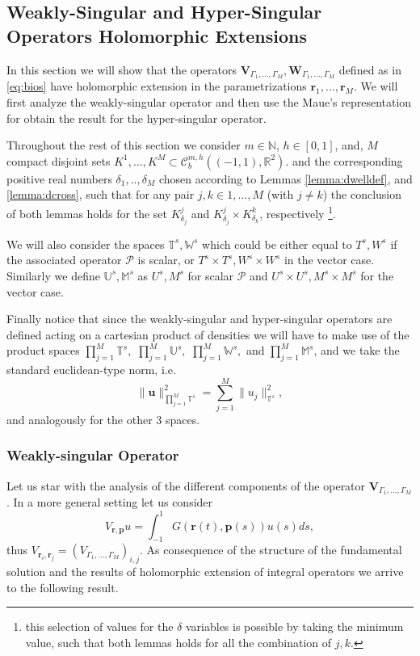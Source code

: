 \documentclass{article}
\newcommand{\IN}{{\mathbb N}}
\newcommand{\IM}{{\mathbb M}}
\newcommand{\IR}{{\mathbb R}}
\newcommand{\IU}{{\mathbb U}}
\newcommand{\IT}{{\mathbb T}}
\newcommand{\IW}{{\mathbb W}}
\newcommand{\bp}{{\bm p}}
\newcommand{\rgeoh}[2]{\mathcal{C}_b^{#1,#2}\left( (-1,1), \IR^2 \right)}
\newcommand{\cP}{\mathcal{P}}
\newcommand{\bu}{\bm{u}}
\newcommand{\br}{\bm{r}}
\begin{document}
\subsection{Weakly-Singular and Hyper-Singular Operators Holomorphic Extensions}
In this section we will show that the operators $\mathbf{V}_{\Gamma_1,\hdots,\Gamma_M}, \mathbf{W}_{\Gamma_1,\hdots,\Gamma_M}$ defined as in \eqref{eq:bios} have holomorphic extension in the parametrizations $\br_1,\hdots,\br_M$. We will first analyze the weakly-singular operator and then use the Maue's representation for obtain the result for the hyper-singular operator. 

Throughout the rest of this section we consider $m\in \IN$, $h \in [0,1]$, and, $M$ compact disjoint sets $K^1,\hdots,K^M \subset \rgeoh{m}{h}$. and the corresponding positive real numbers $\delta_1, ..,\delta_M$ chosen according to Lemmas \ref{lemma:dwelldef}, and \ref{lemma:dcross}, such that for any pair $j,k \in 1,\hdots,M$ (with $j\neq k$) the conclusion of both lemmas holds for the set $K^j_{\delta_j}$ and $ K^j_{\delta_j}\times K^k_{\delta_k}$, respectively \footnote{this selection of values for the $\delta$ variables is possible by taking the minimum value, such that both lemmas holds for all the combination of $j,k$. }. 

We will also consider the spaces $\mathbb{T}^s, \mathbb{W}^s$ which could be either equal to $T^s,W^s$ if the associated operator $\cP$ is scalar, or $T^s\times T^s,W^s\times W^s$ in the vector case. Similarly we define $\mathbb{U}^s, \mathbb{M}^s$ as $U^s,M^s$ for scalar $\cP$ and $U^s\times U^s,M^s\times M^s$ for the vector case.

Finally notice that since the weakly-singular and hyper-singular operators are defined acting on a cartesian product of densities we will have to make use of the product spaces $\prod_{j=1}^M \IT^s,$ $\prod_{j=1}^M \IU^s,$ $\prod_{j=1}^M \IW^s,$ and $\prod_{j=1}^M \IM^s$, and we take the standard euclidean-type norm, i.e.
$$
\| \bu \|_{\prod_{j=1}^M \IT^s}^2 = \sum_{j=1}^M \| u_j \|_{\IT^s}^2,
$$ 
and analogously for the other 3 spaces. 																																																																			   
 
\subsubsection{Weakly-singular Operator}

Let us star with the analysis of the different components of the operator 
$\mathbf{V}_{\Gamma_1,\hdots,\Gamma_M}$. In a more general setting let us consider 
$$V_{\br,\bp}u  = \int_{-1}^1G(\br(t),\bp(s)) u(s) ds,$$
thus $V_{\br_i, \br_j} = (V_{\Gamma_1,\hdots,\Gamma_M})_{i,j}$. As consequence of the structure of the fundamental solution and the results of holomorphic extension of integral operators we arrive to the following result. 
\end{document}
